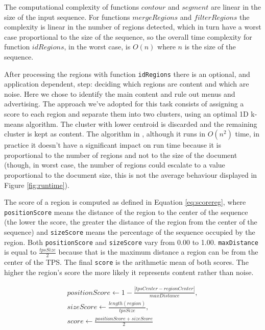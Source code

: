 \documentclass{vldb}
\begin{document}
The computational complexity of functions $contour$ and $segment$ are linear in
the size of the input sequence. For functions $mergeRegions$ and $filterRegions$
the complexity is linear in the number of regions detected, which in turn have a
worst case proportional to the size of the sequence, so the overall time
complexity for function $idRegions$, in the worst case, is $O(n)$ where $n$ is
the size of the sequence.

After processing the regions with function \texttt{idRegions} there is an
optional, and application dependent, step: deciding which regions are content
and which are noise. Here we chose to identify the main content and rule out
menus and advertising. The approach we've adopted for this task consists of
assigning a score to each region and separate them into two clusters, using an
optimal 1D k-means algorithm\cite{1dkmeans2011}. The cluster with lower centroid
is discarded and the remaining cluster is kept as content. The algorithm in
\cite{1dkmeans2011}, although it runs in $O(n^2)$ time, in practice it doesn't
have a significant impact on run time because it is proportional to the number
of regions and not to the size of the document (though, in worst case, the
number of regions could escalate to a value proportional to the document size,
this is not the average behaviour displayed in Figure \ref{fig:runtime}).

The score of a region is computed as defined in Equation \ref{eq:scorereg},
where \texttt{positionScore} means the distance of the region to the center of
the sequence (the lower the score, the greater the distance of the region from
the center of the sequence) and \texttt{sizeScore} means the percentage of the
sequence occupied by the region. Both \texttt{positionScore} and
\texttt{sizeScore} vary from 0.00 to 1.00. \texttt{maxDistance} is equal to
$\frac{tpsSize}{2}$ because that is the maximum distance a region can be from
the center of the TPS. The final \texttt{score} is the arithmetic mean of both
scores. The higher the region's score the more likely it represents content
rather than noise.

\begin{equation}\label{eq:scorereg}
\begin{split}
positionScore \leftarrow 1-\frac{|tpsCenter - regionCenter|}{maxDistance}, \\
sizeScore \leftarrow \frac{length(region)}{tpsSize},\\
score \leftarrow \frac{positionScore+sizeScore}{2}
\end{split}
\end{equation}
\end{document}
